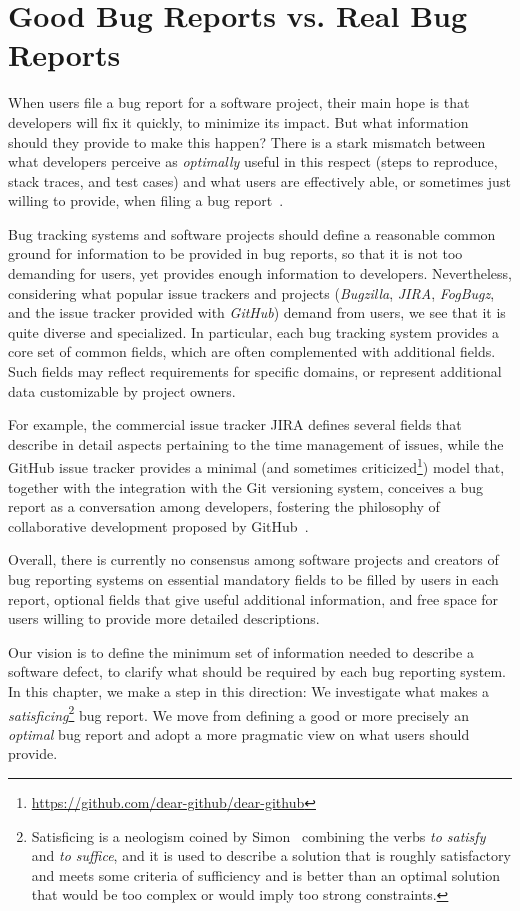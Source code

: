\section{Good Bug Reports vs. Real Bug Reports}\label{sec:model-intro}

When users file a bug report for a software project, their main hope is that developers will fix it quickly, to minimize its impact.
But what information should they provide to make this happen? There is a stark mismatch between what developers perceive as \emph{optimally} useful in this respect (\ie steps to reproduce, stack traces, and test cases) and what users are effectively able, or sometimes just willing to provide, when filing a bug report~\cite{Zimm2010a}.

Bug tracking systems and software projects should define a reasonable common ground for information to be provided in bug reports, so that it is not too demanding for users, yet provides enough information to developers.
Nevertheless, considering what popular issue trackers and projects (\eg \emph{Bugzilla}, \emph{JIRA}, \emph{FogBugz}, and the issue tracker provided with \emph{GitHub}) demand from users, we see that it is quite diverse and specialized.
In particular, each bug tracking system provides a core set of common fields, which are often complemented with additional fields.
Such  fields may reflect requirements for specific domains, or represent additional data customizable by project owners.

For example, the commercial issue tracker JIRA defines several fields that describe in detail aspects pertaining to the time management of issues, while the GitHub issue tracker provides a minimal (and sometimes criticized\footnote{\url{https://github.com/dear-github/dear-github}}) model that, together with the integration with the Git versioning system, conceives a bug report as a conversation among developers, fostering the philosophy of collaborative development proposed by GitHub~\cite{Thun2013}.

Overall, there is currently no consensus among software projects and creators of bug reporting systems on essential mandatory fields to be filled by users in each report, optional fields that give useful additional information, and free space for users willing to provide more detailed descriptions.

Our vision is to define the minimum set of information needed to describe a software defect, to clarify what should be required by each bug reporting system.
In this chapter, we make a step in this direction: We investigate what makes a \emph{satisficing}\footnote{Satisficing is a neologism coined by Simon~\cite{Simo57,Simo01} combining the verbs {\em to satisfy} and {\em to suffice}, and it is used to describe a solution that is roughly satisfactory and meets some criteria of sufficiency and is better than an optimal solution that would be too complex or would imply too strong constraints.} bug report.
We move from defining a good or more precisely an \emph{optimal} bug report and adopt a more pragmatic view on what users should provide.

